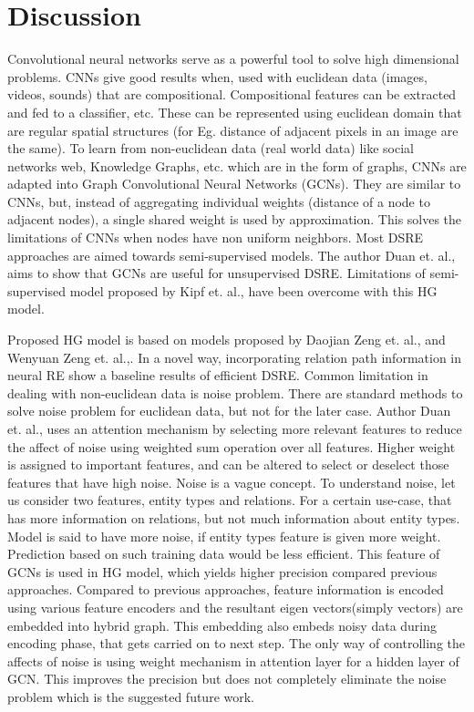 \chapter{Discussion}
\label{ch:discussion}

Convolutional neural networks serve as a powerful tool to solve high dimensional problems. CNNs give good results when, used with euclidean data (images, videos, sounds) that are compositional. Compositional features can be extracted and fed to a classifier, etc. These can be represented using euclidean domain that are regular spatial structures (for Eg. distance of adjacent pixels in an image are the same). To learn from non-euclidean data (real world data) like social networks web, Knowledge Graphs, etc. which are in the form of graphs, CNNs are adapted into Graph Convolutional Neural Networks (GCNs). They are similar to CNNs, but, instead of aggregating individual weights (distance of a node to adjacent nodes), a single shared weight is used by approximation. This solves the limitations of CNNs when nodes have non uniform neighbors. Most DSRE approaches are aimed towards semi-supervised models\cite{smirnova2018relation}. The author Duan et. al.\cite{duan2019hybrid}, aims to show that GCNs are useful for unsupervised DSRE. Limitations of semi-supervised model proposed by Kipf et. al.\cite{kipf2016semi}, have been overcome with this HG model.

\newpar
Proposed HG model is based on models proposed by Daojian Zeng et. al.,\cite{zeng2014relation} and Wenyuan Zeng et. al.,\cite{zeng2016incorporating}. In a novel way, incorporating relation path information in neural RE show a baseline results of efficient DSRE. Common limitation in dealing with non-euclidean data is noise problem. There are standard methods to solve noise problem for euclidean data\cite{zimek2012survey}, but not for the later case. Author Duan et. al.,\cite{duan2019hybrid} uses an attention mechanism by selecting more relevant features to reduce the affect of noise using weighted sum operation over all features. Higher weight is assigned to important features, and can be altered to select or deselect those features that have high noise. Noise is a vague concept. To understand noise, let us consider two features, entity types and relations. For a certain use-case, that has more information on relations, but not much information about entity types. Model is said to have more noise, if entity types feature is given more weight. Prediction based on such training data would be less efficient. This feature of GCNs is used in HG model, which yields higher precision compared previous approaches. Compared to previous approaches, feature information is encoded using various feature encoders and the resultant eigen vectors(simply vectors) are embedded into hybrid graph. This embedding also embeds noisy data during encoding phase, that gets carried on to next step. The only way of controlling the affects of noise is using weight mechanism in attention layer for a hidden layer of GCN. This improves the precision but does not completely eliminate the noise problem which is the suggested future work.

